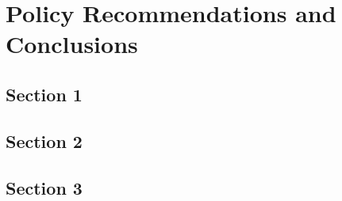 
\chapter{Policy Recommendations and Conclusions}
\section{Section 1}



\section{Section 2}




\section{Section 3}
